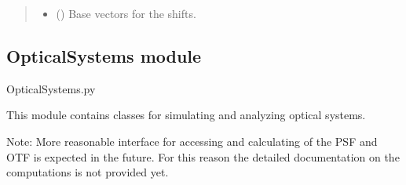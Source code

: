 \documentclass[letterpaper,10pt,english]{sphinxmanual}
\begin{document}
\begin{fulllineitems}
\begin{fulllineitems}
\begin{quote}
\begin{description}
\begin{itemize}
\item {} 
\sphinxAtStartPar
{} () \textendash{} Base vectors for the shifts.

\end{itemize}

\end{description}\end{quote}

\end{fulllineitems}


\begin{fulllineitems}
\label{\detokenize{source/Illumination:Illumination.Illumination.spatial_shifts}}
\pysigstartsignatures
\pysigline
{}
\pysigstopsignatures
\end{fulllineitems}


\end{fulllineitems}


\sphinxstepscope


\subsection{OpticalSystems module}
\label{\detokenize{source/OpticalSystems:module-OpticalSystems}}\label{\detokenize{source/OpticalSystems:opticalsystems-module}}\label{\detokenize{source/OpticalSystems::doc}}
\sphinxAtStartPar
OpticalSystems.py

\sphinxAtStartPar
This module contains classes for simulating and analyzing optical systems.

\sphinxAtStartPar
Note: More reasonable interface for accessing and calculating of the PSF and OTF is expected in the future.
For this reason the detailed documentation on the computations is not provided yet.

\end{document}

